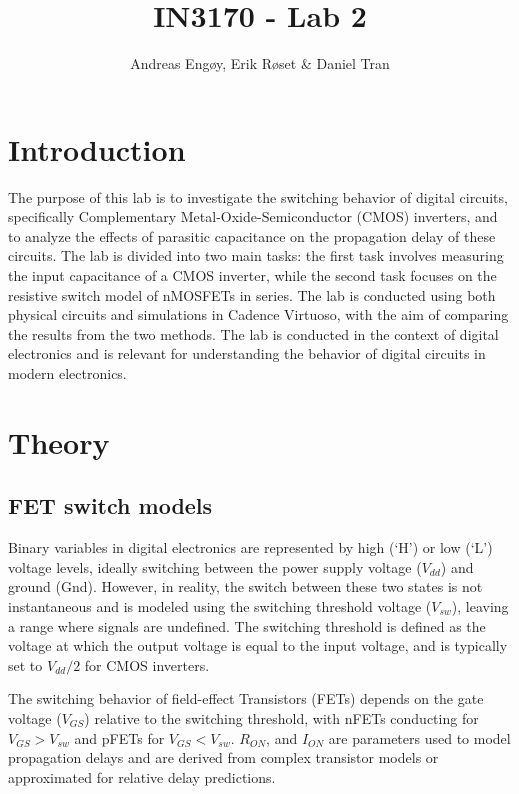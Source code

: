 \documentclass[onecolumn]{article}
\title{IN3170 - Lab 2}
\author{Andreas Engøy, Erik Røset \& Daniel Tran}
\date{\monthname[\the\month] \the\year}
\begin{document}
\maketitle
\tableofcontents

\section{Introduction}
The purpose of this lab is to investigate the switching behavior of digital circuits, specifically Complementary Metal-Oxide-Semiconductor (CMOS) inverters, and to analyze the effects of parasitic capacitance on the propagation delay of these circuits. The lab is divided into two main tasks: the first task involves measuring the input capacitance of a CMOS inverter, while the second task focuses on the resistive switch model of nMOSFETs in series. The lab is conducted using both physical circuits and simulations in Cadence Virtuoso, with the aim of comparing the results from the two methods. The lab is conducted in the context of digital electronics and is relevant for understanding the behavior of digital circuits in modern electronics.

\section{Theory}

\subsection{FET switch models}
Binary variables in digital electronics are represented by high (‘H’) or low (‘L’) voltage levels, ideally switching between the power supply voltage ($V_{dd}$) and ground (Gnd). However, in reality, the switch between these two states is not instantaneous and is modeled using the switching threshold voltage ($V_{sw}$), leaving a range where signals are undefined. The switching threshold is defined as the voltage at which the output voltage is equal to the input voltage, and is typically set to $V_{dd}/2$ for CMOS inverters. 

The switching behavior of field-effect Transistors (FETs) depends on the gate voltage ($V_{GS}$) relative to the switching threshold, with nFETs conducting for $V_{GS} > V_{sw}$ and pFETs for $V_{GS} < V_{sw}$. $R_{ON}$, and $I_{ON}$ are parameters used to model propagation delays and are derived from complex transistor models or approximated for relative delay predictions.
\end{document}
